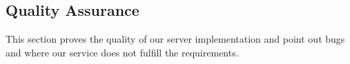 \subsection{Quality Assurance}
This section proves the quality of our server implementation and point out bugs and where our service does not fulfill the requirements.



\newpage